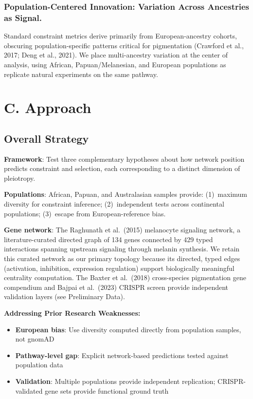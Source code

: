 \documentclass[11pt]{article}
\begin{document}
\subsubsection{Population-Centered Innovation: Variation Across Ancestries as Signal.}
Standard constraint metrics derive primarily from European-ancestry cohorts, obscuring population-specific patterns critical for pigmentation (Crawford et al., 2017; Deng et al., 2021). We place multi-ancestry variation at the center of analysis, using African, Papuan/Melanesian, and European populations as replicate natural experiments on the same pathway.

\section{C. Approach}

\subsection{Overall Strategy}

\textbf{Framework}: Test three complementary hypotheses about how network position predicts constraint and selection, each corresponding to a distinct dimension of pleiotropy.

\textbf{Populations}: African, Papuan, and Australasian samples provide: (1)~maximum diversity for constraint inference; (2)~independent tests across continental populations; (3)~escape from European-reference bias.

\textbf{Gene network}: The Raghunath et al.\ (2015) melanocyte signaling network, a literature-curated directed graph of 134 genes connected by 429 typed interactions spanning upstream signaling through melanin synthesis. We retain this curated network as our primary topology because its directed, typed edges (activation, inhibition, expression regulation) support biologically meaningful centrality computation. The Baxter et al.\ (2018) cross-species pigmentation gene compendium and Bajpai et al.\ (2023) CRISPR screen provide independent validation layers (see Preliminary Data).

\textbf{Addressing Prior Research Weaknesses:}
\begin{itemize}[itemsep=2pt, topsep=2pt]
    \item \textbf{European bias}: Use diversity computed directly from population samples, not gnomAD
    \item \textbf{Pathway-level gap}: Explicit network-based predictions tested against population data
    \item \textbf{Validation}: Multiple populations provide independent replication; CRISPR-validated gene sets provide functional ground truth
\end{itemize}
\end{document}
